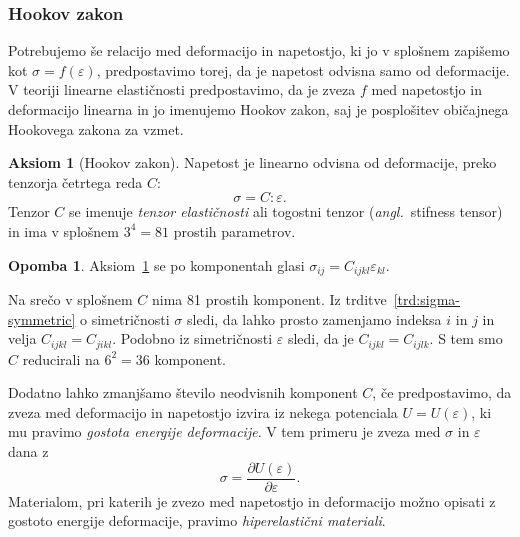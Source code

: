 \documentclass[12pt,a4paper,twoside]{article}
\theoremstyle{definition} %
\newtheorem{opomba}[definicija]{Opomba}
\newtheorem{aksiom}{Aksiom}
\theoremstyle{plain} %
\numberwithin{equation}{section}
\newcommand{\eps}{\varepsilon}
\newcommand{\dpar}[2]{\ensuremath{\frac{\partial #1}{\partial #2}}}
\newcommand{\ts}{\sigma}
\newcommand{\ang}[1]{(\textit{angl.}\ #1)}
\begin{document}
\subsubsection{Hookov zakon}
Potrebujemo še relacijo med deformacijo in napetostjo, ki jo v splošnem zapišemo kot $\ts =
f(\eps)$, predpostavimo torej, da je napetost odvisna samo od deformacije.  V teoriji linearne
elastičnosti predpostavimo, da je zveza $f$ med napetostjo in deformacijo linearna in jo imenujemo
Hookov zakon, saj je posplošitev običajnega Hookovega zakona za vzmet.
\begin{aksiom}[Hookov zakon]
  \label{aks:hook}
  Napetost je linearno odvisna od deformacije, preko tenzorja četrtega reda $C$:
  \begin{equation}
    \label{eq:hooke}
    \ts = C:\eps.
  \end{equation}
  Tenzor $C$ se imenuje \emph{tenzor elastičnosti} ali togostni tenzor
  \ang{stifness tensor} in ima v splošnem $3^4 = 81$ prostih parametrov.
\end{aksiom}
\begin{opomba}
  Aksiom~\ref{aks:hook} se po komponentah glasi $\ts_{ij} = C_{ijkl}
  \eps_{kl}$.
\end{opomba}
Na srečo v splošnem $C$ nima 81 prostih komponent.
Iz trditve~\ref{trd:sigma-symmetric} o simetričnosti $\ts$ sledi, da lahko
prosto zamenjamo indeksa $i$ in $j$ in velja $C_{ijkl} = C_{jikl}$.
Podobno iz simetričnosti $\eps$ sledi, da je $C_{ijkl} = C_{ijlk}$.
S tem smo $C$ reducirali na $6^2 = 36$ komponent.

Dodatno lahko zmanjšamo število neodvisnih komponent $C$, če predpostavimo, da zveza med deformacijo
in napetostjo izvira iz nekega potenciala $U = U(\eps)$, ki mu pravimo \emph{gostota energije
deformacije}. V tem primeru je zveza med $\ts$ in $\eps$ dana z
\begin{equation}
   \ts = \dpar{U(\eps)}{\eps}.
\end{equation}
Materialom, pri katerih je zvezo med napetostjo in deformacijo možno opisati z gostoto energije
deformacije, pravimo \emph{hiperelastični materiali}.
\end{document}
